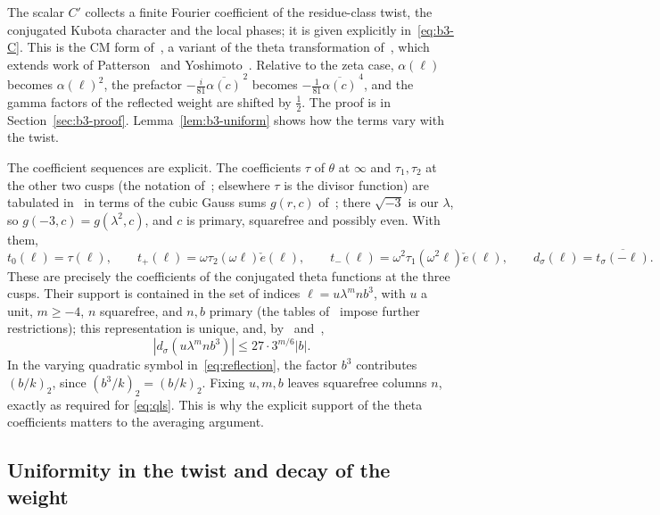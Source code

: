 \documentclass[11pt]{article}
\numberwithin{equation}{section}
\newcommand{\ce}{\check e}
\begin{document}
The scalar $C'$ collects a finite Fourier coefficient of the
residue-class twist, the conjugated Kubota character and the local
phases; it is given explicitly in~\eqref{eq:b3-C}. This is the CM form
of~\cite[Proposition~6.2]{OAI1112}, a variant of the theta transformation of~\cite[Section~5]{DR}, which extends work of Patterson~\cite{Pat77} and Yoshimoto~\cite{Yos87}. Relative to the zeta case, $\alpha(\ell)$
becomes $\alpha(\ell)^2$, the prefactor
$-\frac i{81}\overline{\alpha(c)}^{\,2}$ becomes
$-\frac1{81}\overline{\alpha(c)}^{\,4}$, and the gamma factors of the
reflected weight are shifted by $\frac12$. The proof is in
Section~\ref{sec:b3-proof}. Lemma~\ref{lem:b3-uniform} shows how the
terms vary with the twist.

The coefficient sequences are explicit. The coefficients $\tau$ of
$\theta$ at $\infty$ and $\tau_1,\tau_2$ at the other two cusps (the notation
of~\cite{QF}; elsewhere $\tau$ is the divisor function) are
tabulated in~\cite[Theorem~23, (5.7), (5.9), (5.10)]{QF} in terms of the
cubic Gauss sums $g(r,c)$ of~\cite[(5.5)]{QF}; there $\sqrt{-3}$ is our
$\lambda$, so $g(-3,c)=g(\lambda^2,c)$, and $c$ is primary, squarefree and
possibly even. With them,
\begin{equation}\label{eq:d098}
 t_0(\ell)=\tau(\ell),\qquad
 t_+(\ell)=\omega\tau_2(\omega\ell)\ce(\ell),\qquad
 t_-(\ell)=\omega^2\tau_1(\omega^2\ell)\ce(\ell),\qquad
 d_\sigma(\ell)=\overline{t_\sigma(-\ell)}.
\end{equation}
These are precisely the coefficients of the conjugated theta functions
at the three cusps. Their support is contained in the set of indices
$\ell=u\lambda^mnb^3$, with $u$ a unit, $m\ge-4$, $n$ squarefree,
and $n,b$ primary (the tables of~\cite{QF} impose further restrictions);
this representation is unique, and, by~\cite[Corollary~24]{QF}
and~\cite[Lemma~6.4]{OAI1112},
\begin{equation}\label{eq:d099}
 |d_\sigma(u\lambda^mnb^3)|\le27\cdot3^{m/6}|b|.
\end{equation}
In the varying quadratic symbol in~\eqref{eq:reflection}, the factor
$b^3$ contributes $(b/k)_2$, since $(b^3/k)_2=(b/k)_2$.
Fixing $u,m,b$ leaves squarefree columns $n$, exactly as required for
\eqref{eq:qls}. This is why the explicit support of the theta
coefficients matters to the averaging argument.

\subsection{Uniformity in the twist and decay of the weight}\label{sec:b3-lemmas}
\end{document}
